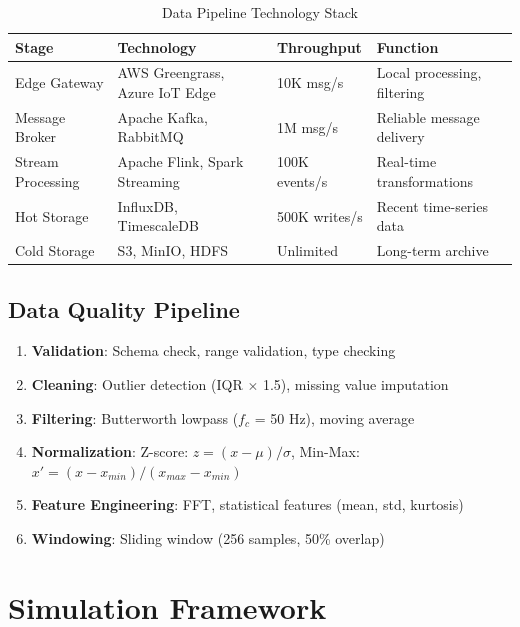 \documentclass[12pt,a4paper]{article}
\begin{document}
\begin{table}[H]
\centering
\caption{Data Pipeline Technology Stack}
\begin{tabular}{llll}
\toprule
\textbf{Stage} & \textbf{Technology} & \textbf{Throughput} & \textbf{Function} \\
\midrule
Edge Gateway & AWS Greengrass, Azure IoT Edge & 10K msg/s & Local processing, filtering \\
Message Broker & Apache Kafka, RabbitMQ & 1M msg/s & Reliable message delivery \\
Stream Processing & Apache Flink, Spark Streaming & 100K events/s & Real-time transformations \\
Hot Storage & InfluxDB, TimescaleDB & 500K writes/s & Recent time-series data \\
Cold Storage & S3, MinIO, HDFS & Unlimited & Long-term archive \\
\bottomrule
\end{tabular}
\end{table}

\subsection{Data Quality Pipeline}

\begin{tcolorbox}[colback=dataorange!10, colframe=dataorange, title=Data Quality Stages]
\begin{enumerate}
    \item \textbf{Validation}: Schema check, range validation, type checking
    \item \textbf{Cleaning}: Outlier detection (IQR $\times$ 1.5), missing value imputation
    \item \textbf{Filtering}: Butterworth lowpass ($f_c$ = 50 Hz), moving average
    \item \textbf{Normalization}: Z-score: $z = (x - \mu) / \sigma$, Min-Max: $x' = (x - x_{min}) / (x_{max} - x_{min})$
    \item \textbf{Feature Engineering}: FFT, statistical features (mean, std, kurtosis)
    \item \textbf{Windowing}: Sliding window (256 samples, 50\% overlap)
\end{enumerate}
\end{tcolorbox}

\section{Simulation Framework}
\end{document}
